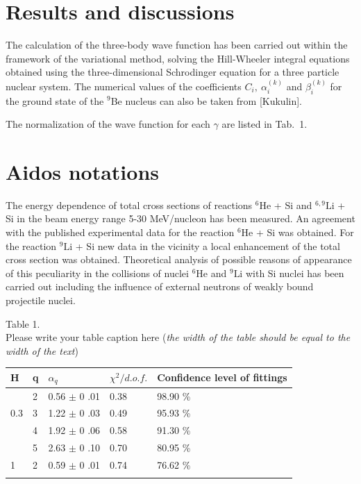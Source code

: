 \documentclass[12pt,a4paper,twoside]{article}
\begin{document}
\section*{Results and discussions}

The calculation of the three-body wave function has been carried out within the framework of the variational method, solving the Hill-Wheeler integral equations obtained using the three-dimensional Schrodinger equation for a three particle nuclear system.
The numerical values of the coefficients $C_i,~\alpha^{(k)}_i$ and $\beta^{(k)}_i$ for the ground state of the $^9$Be nucleus can also be taken  from [Kukulin].

The normalization of the wave function for each $\gamma$ are listed in Tab.~1.









\section{Aidos notations}







The energy dependence of total cross sections of reactions $^6\text{He}$ + Si and $^{6,9}\text{Li}$ + Si in the beam energy range 5-30 MeV/nucleon has been measured. An agreement with the published experimental data for the reaction $^6$He + Si was obtained. For the reaction $^9\text{Li}$ + Si new data in the vicinity a local enhancement of the total cross section was obtained. Theoretical analysis of possible reasons of appearance of this peculiarity in the collisions of nuclei $^6\text{He}$ and $^9\text{Li}$ with Si nuclei has been carried out including the influence of external neutrons of weakly bound projectile nuclei.
\\[0.3cm]

\begin{flushleft}
Table 1.\\
Please write your table caption here (\textit{the width of the table should be equal to the width of the text})\\
\begin{tabular}{p{1cm}|p{2.8cm}|p{3cm}|p{3cm}|p{3cm}}
\hline\noalign{\smallskip}
H&   q &  $\alpha_q$&   $\chi^{2}/d.o.f.$  & Confidence level of fittings\\ \hline\noalign{\smallskip}
 &2 &0.56 $\pm$  0 .01 & 0.38 & 98.90 \% \\ \cline{2-5}
0.3		&3 &1.22 $\pm$  0 .03 & 0.49 & 95.93 \% \\\cline{2-5}
		&4 &1.92 $\pm$  0 .06 & 0.58 & 91.30 \% \\\cline{2-5}
		&5 &2.63 $\pm$  0 .10 & 0.70 & 80.95 \% \\\hline\noalign{\smallskip}
1 	&2 &0.59 $\pm$  0 .01  &0.74 & 76.62 \% \\ \hline\noalign{\smallskip}
\end{tabular}\\[0.3cm]
\end{flushleft}
\end{document}
